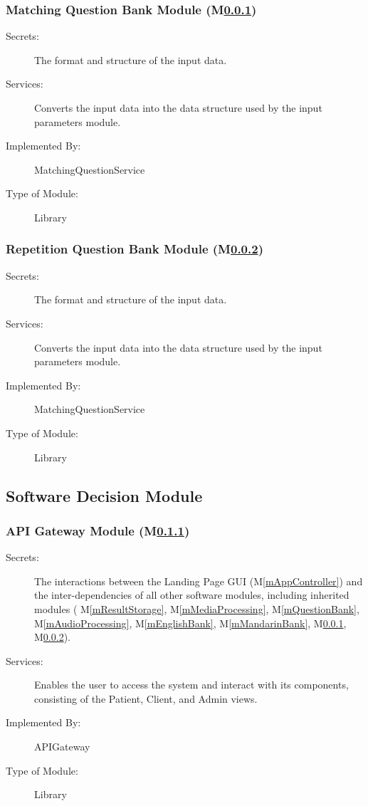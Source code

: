 \documentclass[12pt, titlepage]{article}
\newcounter{mnum}
\newcommand{\mref}[1]{M\ref{#1}}
\begin{document}
\subsubsection{Matching Question Bank Module (\mref{mMatchingBank1})}
\label{mMatchingBank1}

\begin{description}
\item[Secrets:]The format and structure of the input data.
\item[Services:]Converts the input data into the data structure used by the
  input parameters module.
\item[Implemented By:] MatchingQuestionService
\item[Type of Module:] Library
\end{description}

\subsubsection{Repetition Question Bank Module (\mref{mRepetitionBank1})}
\label{mRepetitionBank1}

\begin{description}
\item[Secrets:]The format and structure of the input data.
\item[Services:]Converts the input data into the data structure used by the
  input parameters module.
\item[Implemented By:] MatchingQuestionService
\item[Type of Module:] Library
\end{description}

\subsection{Software Decision Module}

    \subsubsection{API Gateway Module (\mref{mAPIGateway})}
    \label{mAPIGateway}
  
    \begin{description}
      \item[Secrets:]The interactions between the Landing Page GUI (\mref{mAppController}) and the inter-dependencies of all other software modules, including inherited modules (
      \mref{mResultStorage},
      \mref{mMediaProcessing},
      \mref{mQuestionBank},
      \mref{mAudioProcessing},
      \mref{mEnglishBank},
      \mref{mMandarinBank},
      \mref{mMatchingBank1},
      \mref{mRepetitionBank1}).
      \item[Services:]Enables the user to access the system and interact with its components, consisting of the Patient, Client, and Admin views.
      \item[Implemented By:] APIGateway
      \item[Type of Module:] Library
      \end{description}
\end{document}
